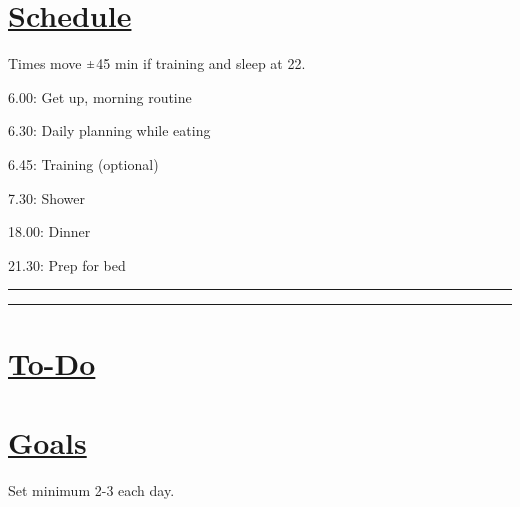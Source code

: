 \documentclass[11pt]{article}
\newcommand{\rpm}{\raisebox{.2ex}{$\scriptstyle\pm$}}
\begin{document}
\begin{multicols}{2}

\section*{\underline{Schedule}} 
Times move $\rpm$45 min if training and sleep at 22. 
  \begin{todolist}[itemsep=8pt]
    \item 6.00: Get up, morning routine
	\item 6.30: Daily planning while eating   
    \item 6.45: Training (optional)
    \item 7.30: Shower
    \item
    \item 
    \item 
    \item     
    \item 18.00: Dinner
    \item 21.30: Prep for bed
  \end{todolist}

\begin{flushleft}
\rule{122pt}{1pt}\vline\rule{122pt}{1pt}
\end{flushleft}


\section*{\underline{To-Do}}
  \begin{todolist}[itemsep=8pt]
    \item 
    \item 
    \item 
    \item 
    \item 
  \end{todolist}

\columnbreak

\section*{\underline{Goals}}
Set minimum 2-3 each day.
  \begin{todolist}[itemsep=8pt]
    \item 
    \item 
    \item 
    \item 
    \item 
  \end{todolist}


\end{multicols}
\end{document}
